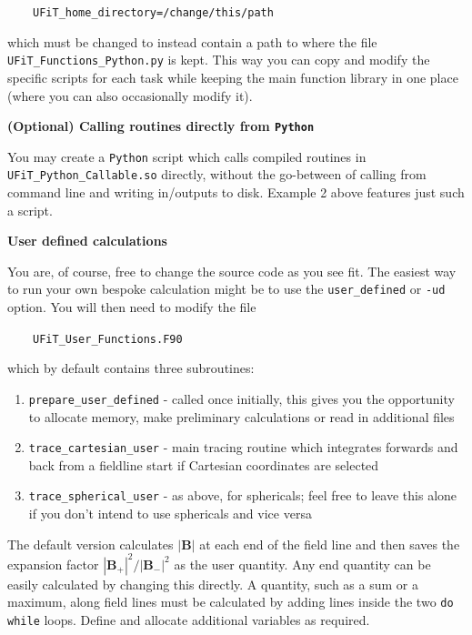 \documentclass[12pt,twoside]{article}
\begin{document}
$\quad\quad$\texttt{UFiT\_home\_directory=\textquotesingle /change/this/path\textquotesingle }

which must be changed to instead contain a path to where the file \texttt{UFiT\_Functions\_Python.py} is kept. This way you can copy and modify the specific scripts for each task while keeping the main function library in one place (where you can also occasionally modify it).


\vspace{2mm}
{\large \textbf{(Optional) Calling routines directly from \texttt{Python}}}

You may create a \texttt{Python} script which calls compiled routines in \texttt{UFiT\_Python\_Callable.so} directly, without the go-between of calling from command line and writing in/outputs to disk. Example 2 above features just such a script.


\vspace{2mm}
{\Large \textbf{User defined calculations}}

You are, of course, free to change the source code as you see fit. The easiest way to run your own bespoke calculation might be to use the \texttt{user\_defined} or \texttt{-ud} option. You will then need to modify the file 

$\quad\quad$\texttt{UFiT\_User\_Functions.F90}

which by default contains three subroutines:
\begin{enumerate}
\item\texttt{prepare\_user\_defined} - called once initially, this gives you the opportunity to allocate memory, make preliminary calculations or read in additional files

\item\texttt{trace\_cartesian\_user} - main tracing routine which integrates forwards and back from a fieldline start if Cartesian coordinates are selected

\item\texttt{trace\_spherical\_user} - as above, for sphericals; feel free to leave this alone if you don't intend to use sphericals and vice versa
\end{enumerate}

The default version calculates $|\mathbf{B}|$ at each end of the field line and then saves the expansion factor $|\mathbf{B}_+|^2/|\mathbf{B}_-|^2$ as the user quantity. Any end quantity can be easily calculated by changing this directly. A quantity, such as a sum or a maximum, along field lines must be calculated by adding lines inside the two \texttt{do while} loops. Define and allocate additional variables as required.
\end{document}
